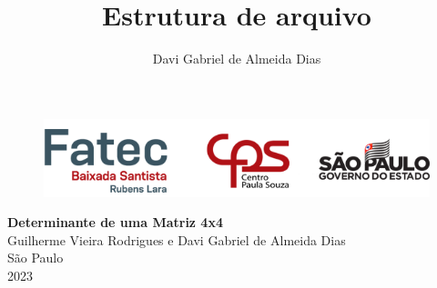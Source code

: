 \documentclass[12pt, a4paper, brazil]{article}
\author{Davi Gabriel de Almeida Dias}
\title{Estrutura de arquivo}
\begin{document}
	\begin{center}
	\begin{figure}[!htpb]
		\centering
		\includegraphics[width=170mm]{logo}
    \vspace{8cm}
	\end{figure}
		{\LARGE \textbf{Determinante de uma Matriz 4x4} \\[3mm]}
		{\large Guilherme Vieira Rodrigues e Davi Gabriel de Almeida Dias}
    \vspace{9cm}
       \\ São Paulo\\2023
	\end{center}
	\newpage
    
\end{document}

